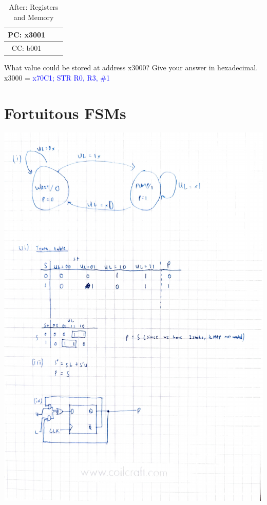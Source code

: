 \documentclass{article}
\begin{document}
\begin{enumerate}[label=(\alph*)]
\begin{enumerate}[label=(\roman*)]
\begin{table}[h]
\begin{tabular}{|c|c|c|}
            PC: x3001 & & \\
            \hline
            CC: b001 & & \\
            \hline
            \end{tabular}
            \caption{After: Registers and Memory}
            \end{table}
            \newline
            What value could be stored at address x3000? Give your answer in hexadecimal.
            \newline
            \newline
            x3000 = \textcolor{blue}{x70C1; STR R0, R3, \#1}
        \end{enumerate}
        \newpage
    \end{enumerate}
    \section{Fortuitous FSMs}
    \includegraphics[scale=0.75]{figures/7a sol.pdf}
\end{document}
